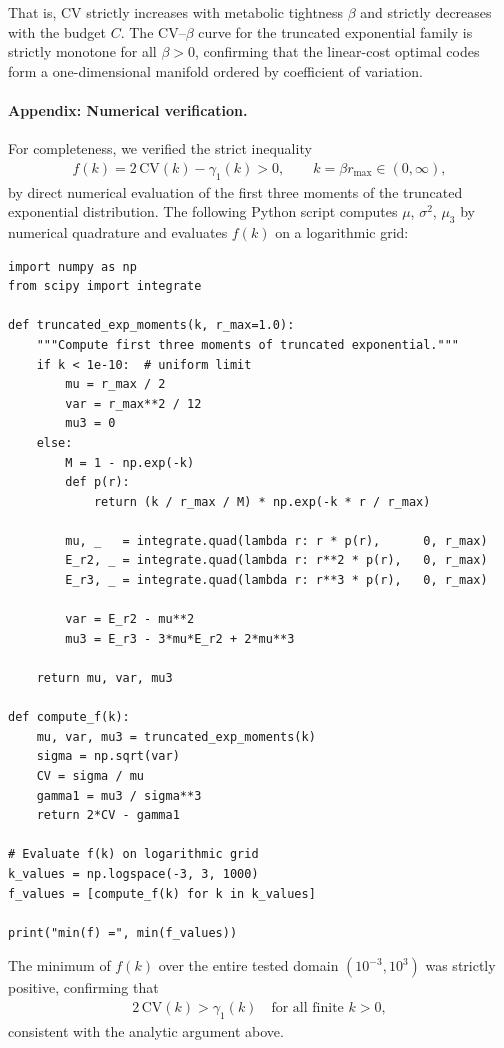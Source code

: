 \documentclass[11pt]{article}
\theoremstyle{remark}
\theoremstyle{definition}
\begin{document}
That is, $\mathrm{CV}$ strictly increases with metabolic tightness
$\beta$ and strictly decreases with the budget $C$.  The CV--$\beta$
curve for the truncated exponential family is strictly monotone for
all $\beta>0$, confirming that the linear-cost optimal codes form a
one-dimensional manifold ordered by coefficient of variation.

\paragraph{Appendix: Numerical verification.}

For completeness, we verified the strict inequality
\begin{align}
f(k)= 2\,\mathrm{CV}(k)-\gamma_1(k) > 0,
\qquad k=\beta r_{\max}\in(0,\infty),
\end{align}
by direct numerical evaluation of the first three moments of the
truncated exponential distribution.  
The following Python script computes $\mu$, $\sigma^2$, $\mu_3$ by
numerical quadrature and evaluates $f(k)$ on a logarithmic grid:

\begin{verbatim}
import numpy as np
from scipy import integrate

def truncated_exp_moments(k, r_max=1.0):
    """Compute first three moments of truncated exponential."""
    if k < 1e-10:  # uniform limit
        mu = r_max / 2
        var = r_max**2 / 12
        mu3 = 0
    else:
        M = 1 - np.exp(-k)
        def p(r):
            return (k / r_max / M) * np.exp(-k * r / r_max)

        mu, _   = integrate.quad(lambda r: r * p(r),      0, r_max)
        E_r2, _ = integrate.quad(lambda r: r**2 * p(r),   0, r_max)
        E_r3, _ = integrate.quad(lambda r: r**3 * p(r),   0, r_max)

        var = E_r2 - mu**2
        mu3 = E_r3 - 3*mu*E_r2 + 2*mu**3

    return mu, var, mu3

def compute_f(k):
    mu, var, mu3 = truncated_exp_moments(k)
    sigma = np.sqrt(var)
    CV = sigma / mu
    gamma1 = mu3 / sigma**3
    return 2*CV - gamma1

# Evaluate f(k) on logarithmic grid
k_values = np.logspace(-3, 3, 1000)
f_values = [compute_f(k) for k in k_values]

print("min(f) =", min(f_values))
\end{verbatim}

The minimum of $f(k)$ over the entire tested domain $(10^{-3},10^{3})$
was strictly positive, confirming that
\begin{align}
2\,\mathrm{CV}(k) > \gamma_1(k)
\quad\text{for all finite } k>0,
\end{align}
consistent with the analytic argument above.
\end{document}
